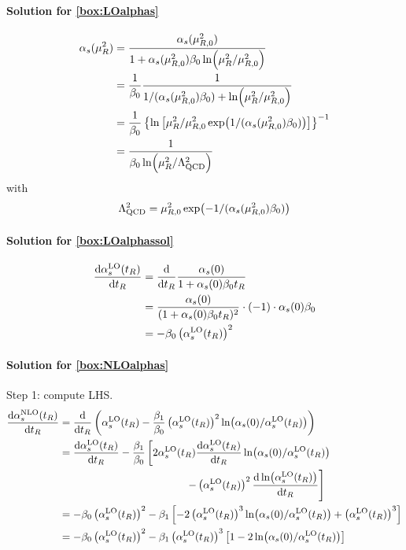 \paragraph{Solution for \cref{box:LOalphas}}
\begin{align}
    \alpha_s(\mu_R^2) &= \frac{\alpha_s(\mu_{R,0}^2)}{1 + \alpha_s(\mu_{R,0}^2)\beta_0\ln(\mu_R^2/\mu_{R,0}^2)}\\
    &= \frac 1 {\beta_0} \frac{1}{1/(\alpha_s(\mu_{R,0}^2)\beta_0) + \ln(\mu_R^2/\mu_{R,0}^2)}\\
    &= \frac 1 {\beta_0} \left\{\ln\left[\mu_R^2/\mu_{R,0}^2\exp(1/(\alpha_s(\mu_{R,0}^2)\beta_0))\right]\right\}^{-1}\\
    &= \frac 1 {\beta_0 \ln(\mu_R^2/\Lambda_\text{QCD}^2)}
\end{align}
with
\begin{equation}
    \Lambda_\text{QCD}^2 = \mu_{R,0}^2\exp(-1/(\alpha_s(\mu_{R,0}^2)\beta_0))
\end{equation}

\paragraph{Solution for \cref{box:LOalphassol}}
\begin{align}
    \dv {\alpha_s^\text{LO}(t_R)}{t_R} &= \dv {t_R}  \frac{\alpha_s(0)}{1 + \alpha_s(0) \beta_0 t_R}\\
     &= \frac{\alpha_s(0)}{(1 + \alpha_s(0) \beta_0 t_R)^2} \cdot (-1) \cdot \alpha_s(0) \beta_0\\
     &= -\beta_0 \left(\alpha_s^\text{LO}(t_R)\right)^2
\end{align}

\paragraph{Solution for \cref{box:NLOalphas}}
Step 1: compute LHS.
\begin{align}
    \dv {\alpha_s^\text{NLO}(t_R)}{t_R} &= \dv {t_R} \left(\alpha_s^\text{LO}(t_R) - \frac{\beta_1}{\beta_0} \left(\alpha_s^\text{LO}(t_R)\right)^2 \ln(\alpha_s(0) / \alpha_s^\text{LO}(t_R)) \right)\\
     &= \dv {\alpha_s^\text{LO}(t_R)}{t_R} - \frac{\beta_1}{\beta_0} \left[ 2 \alpha_s^\text{LO}(t_R) \dv {\alpha_s^\text{LO}(t_R)}{t_R} \ln(\alpha_s(0) / \alpha_s^\text{LO}(t_R)) \right. \nonumber\\
     &\hspace{120pt} \left. - \left(\alpha_s^\text{LO}(t_R)\right)^2 \dv{\ln(\alpha_s^\text{LO}(t_R))}{t_R}  \right]\\
     &= -\beta_0 \left(\alpha_s^\text{LO}(t_R)\right)^2 - \beta_1\left[  -2\left(\alpha_s^\text{LO}(t_R)\right)^3\ln(\alpha_s(0) / \alpha_s^\text{LO}(t_R)) + \left(\alpha_s^\text{LO}(t_R)\right)^3 \right]\\
     &= -\beta_0 \left(\alpha_s^\text{LO}(t_R)\right)^2 - \beta_1\left(\alpha_s^\text{LO}(t_R)\right)^3\left[1  -2\ln(\alpha_s(0) / \alpha_s^\text{LO}(t_R))\right]
\end{align}

